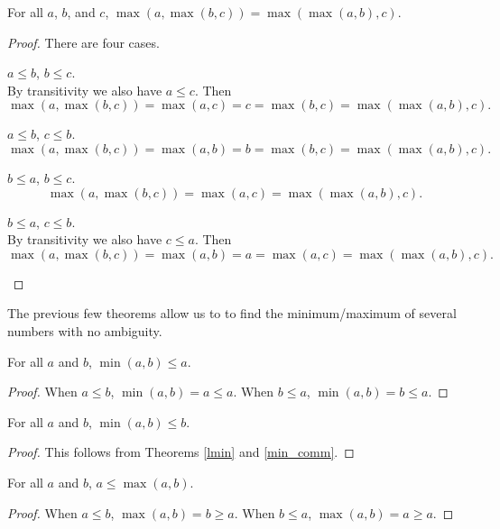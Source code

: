 \documentclass[../../math.tex]{subfiles}
\begin{document}
\begin{theorem}
    For all $a$, $b$, and $c$, $\max(a, \max(b, c)) = \max(\max(a, b), c)$.
\end{theorem}
\begin{proof}
    There are four cases.
    \begin{case} $a \leq b$, $b \leq c$. \\
        By transitivity we also have $a \leq c$.  Then
        \[
            \max(a, \max(b, c)) = \max(a, c) =
            c
            = \max(b, c) = \max(\max(a, b), c).
        \]
    \end{case}
    \begin{case} $a \leq b$, $c \leq b$.
        \[
            \max(a, \max(b, c)) = \max(a, b) =
            b
            = \max(b, c) = \max(\max(a, b), c).
        \]
    \end{case}
    \begin{case} $b \leq a$, $b \leq c$.
        \[
            \max(a, \max(b, c)) =
            \max(a, c)
            = \max(\max(a, b), c).
        \]
    \end{case}
    \begin{case} $b \leq a$, $c \leq b$. \\
        By transitivity we also have $c \leq a$.  Then
        \[
            \max(a, \max(b, c)) = \max(a, b) =
            a
            = \max(a, c) = \max(\max(a, b), c).
        \]
    \end{case}
\end{proof}

The previous few theorems allow us to to find the minimum/maximum of several
numbers with no ambiguity.

\begin{theorem} \label{lmin}
    For all $a$ and $b$, $\min(a, b) \leq a$.
\end{theorem}
\begin{proof}
    When $a \leq b$, $\min(a, b) = a \leq a$.  When $b \leq a$, $\min(a, b) = b
    \leq a$.
\end{proof}

\begin{theorem} \label{rmin}
    For all $a$ and $b$, $\min(a, b) \leq b$.
\end{theorem}
\begin{proof}
    This follows from Theorems \ref{lmin} and \ref{min_comm}.
\end{proof}

\begin{theorem} \label{lmax}
    For all $a$ and $b$, $a \leq \max(a, b)$.
\end{theorem}
\begin{proof}
    When $a \leq b$, $\max(a, b) = b \geq a$.  When $b \leq a$, $\max(a, b) = a
    \geq a$.
\end{proof}
\end{document}
